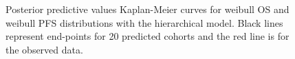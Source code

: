\documentclass[AMA,STIX1COL]{WileyNJD-v2}
\begin{document}
\begin{figure}[H]
    \centering
    \qquad
    \caption{Posterior predictive values Kaplan-Meier curves for weibull OS and weibull PFS distributions with the hierarchical model. Black lines represent end-points for 20 predicted cohorts and the red line is for the observed data.}%


\end{figure}
\end{document}
